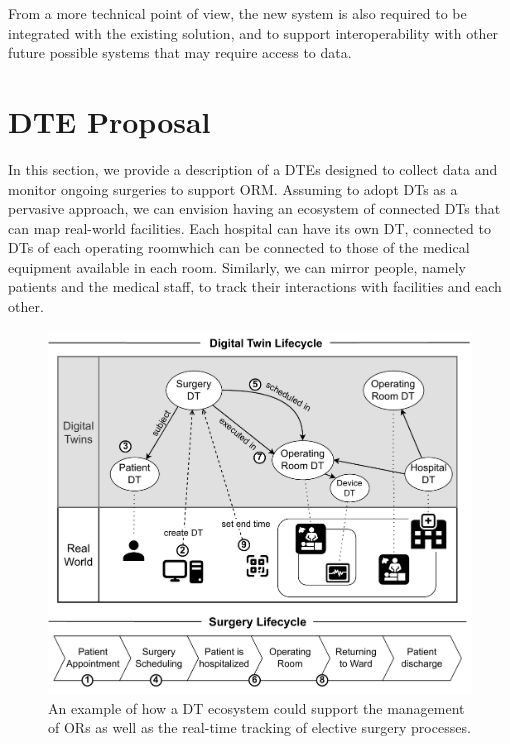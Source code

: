 From a more technical point of view, the new system is also required to be integrated with the existing solution, and to support interoperability with other future possible systems that may require access to data.

\section{\acl{DTE} Proposal}

In this section, we provide a description of a \acp{DTE} designed to collect data and monitor ongoing surgeries to support ORM.
%
Assuming to adopt DTs as a pervasive approach, we can envision having an ecosystem of connected DTs that can map real-world facilities.
%
Each hospital can have its own DT, connected to DTs of each operating roomwhich can be connected to those of the medical equipment available in each room.
%
Similarly, we can mirror people, namely patients and the medical staff, to track their interactions with facilities and each other.

\begin{figure}
    \centering
    \includegraphics[width=\columnwidth]{figures/orm/DTORM.pdf}
    \caption{An example of how a DT ecosystem could support the management of ORs as well as the real-time tracking of elective surgery processes.}
    \label{fig:dt-orm-ecosystem}
\end{figure}

